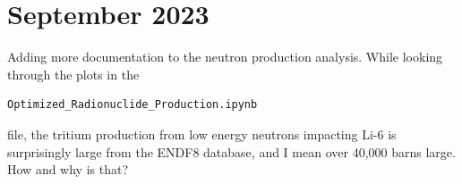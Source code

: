 \documentclass[12pt]{article}
\begin{document}
\section{September 2023}
Adding more documentation to the neutron production analysis. While looking through the plots in the 
\begin{lstlisting}
Optimized_Radionuclide_Production.ipynb
\end{lstlisting}
file, the tritium production from low energy neutrons impacting Li-6 is surprisingly large from the ENDF8 database, and I mean over 40,000 barns large. How and why is that? 
\end{document}
